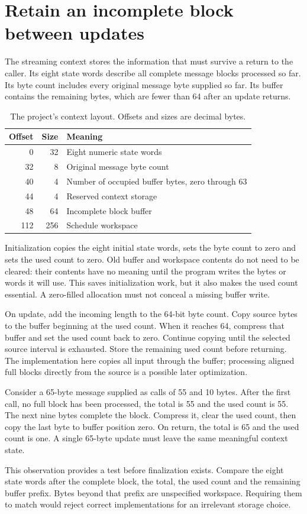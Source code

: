 \section{Retain an incomplete block between updates}
The streaming context stores the information that must survive a return to the caller.
Its eight state words describe all complete message blocks processed so far. Its byte
count includes every original message byte supplied so far. Its buffer contains the
remaining bytes, which are fewer than 64 after an update returns.

\begin{table}[htbp]
\centering\caption{The project's context layout. Offsets and sizes are decimal bytes.}
\begin{tabular}{rrl}
\toprule Offset & Size & Meaning\\\midrule
0 & 32 & Eight numeric state words\\
32 & 8 & Original message byte count\\
40 & 4 & Number of occupied buffer bytes, zero through 63\\
44 & 4 & Reserved context storage\\
48 & 64 & Incomplete block buffer\\
112 & 256 & Schedule workspace\\
\bottomrule
\end{tabular}
\end{table}

Initialization copies the eight initial state words, sets the byte count to zero and
sets the used count to zero. Old buffer and workspace contents do not need to be
cleared: their contents have no meaning until the program writes the bytes or words it
will use. This saves initialization work, but it also makes the used count essential.
A zero-filled allocation must not conceal a missing buffer write.

On update, add the incoming length to the 64-bit byte count. Copy source bytes to the
buffer beginning at the used count. When it reaches 64, compress that buffer and set
the used count back to zero. Continue copying until the selected source interval is
exhausted. Store the remaining used count before returning. The implementation here
copies all input through the buffer; processing aligned full blocks directly from the
source is a possible later optimization.

Consider a 65-byte message supplied as calls of 55 and 10 bytes. After the first call,
no full block has been processed, the total is 55 and the used count is 55. The next
nine bytes complete the block. Compress it, clear the used count, then copy the last
byte to buffer position zero. On return, the total is 65 and the used count is one.
A single 65-byte update must leave the same meaningful context state.

This observation provides a test before finalization exists. Compare the eight state
words after the complete block, the total, the used count and the remaining buffer
prefix. Bytes beyond that prefix are unspecified workspace. Requiring them to match
would reject correct implementations for an irrelevant storage choice.
